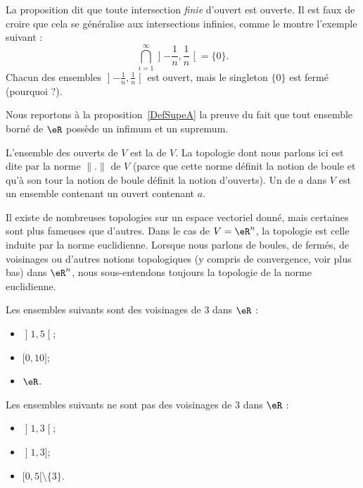 La proposition dit que toute intersection \emph{finie} d'ouvert est ouverte. Il est faux de croire que cela se généralise aux intersections infinies, comme le montre l'exemple suivant :
\begin{equation}
	\bigcap_{i=1}^{\infty}\mathopen] -\frac{1}{ n } , \frac{1}{ n } \mathclose[=\{ 0 \}.
\end{equation}
Chacun des ensembles \( \mathopen] -\frac{1}{ n } , \frac{1}{ n } \mathclose[\) est ouvert, mais le singleton \( \{ 0 \}\) est fermé (pourquoi ?).

Nous reportons à la proposition~\ref{DefSupeA} la preuve du fait que tout ensemble borné de \( \eR\) possède un infimum et un supremum.



\begin{definition}
	L'ensemble des ouverts de \( V\) est la  de \( V\). La topologie dont nous parlons ici est dite  par la norme \( \| . \|\) de \( V\) (parce que cette norme définit la notion de boule et qu'à son tour la notion de boule définit la notion d'ouverts). Un  de \( a\) dans \( V\) est un ensemble contenant un ouvert contenant \( a\).
\end{definition}

Il existe de nombreuses topologies sur un espace vectoriel donné, mais certaines sont plus fameuses que d'autres. Dans le cas de \( V=\eR^n\), la topologie  est celle induite par la norme euclidienne. Lorsque nous parlons de boules, de fermés, de voisinages ou d'autres notions topologiques (y compris de convergence, voir plus bas) dans \( \eR^n\), nous sous-entendons toujours la topologie de la norme euclidienne.

\begin{example}
	Les ensembles suivants sont des voisinages de \( 3\) dans \( \eR\) :
	\begin{itemize}
		\item
		      \( \mathopen] 1 , 5 \mathclose[\);
		\item
		      \( \mathopen[ 0 , 10 \mathclose]\);
		\item
		      \( \eR\).
	\end{itemize}
	Les ensembles suivants ne sont pas des voisinages de \( 3\) dans \( \eR\) :
	\begin{itemize}
		\item
		      \( \mathopen] 1 , 3 \mathclose[\);
		\item
		      \( \mathopen] 1 , 3 \mathclose]\);
		\item
		      \( \mathopen[ 0 , 5 [\setminus\{ 3 \}\).
	\end{itemize}
\end{example}

